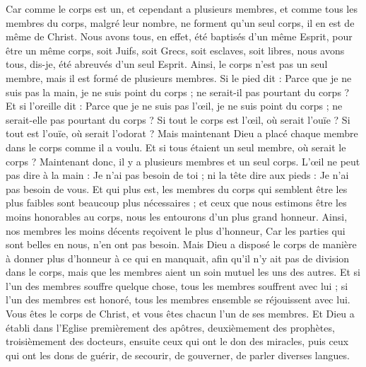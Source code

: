 \begin{multicols}{2}
Car comme le corps est un, et cependant a plusieurs membres, et comme tous les membres du corps, malgré leur nombre, ne forment qu'un seul corps, il en est de même de Christ.
Nous avons tous, en effet, été baptisés d'un même Esprit, pour être un même corps, soit Juifs, soit Grecs, soit esclaves, soit libres, nous avons tous, dis-je, été abreuvés d'un seul Esprit.
Ainsi, le corps n'est pas un seul membre, mais il est formé de plusieurs membres.
Si le pied dit : Parce que je ne suis pas la main, je ne suis point du corps ; ne serait-il pas pourtant du corps ?
Et si l'oreille dit : Parce que je ne suis pas l'œil, je ne suis point du corps ; ne serait-elle pas pourtant du corps ?
Si tout le corps est l'œil, où serait l'ouïe ? Si tout est l'ouïe, où serait l'odorat ?
Mais maintenant Dieu a placé chaque membre dans le corps comme il a voulu.
Et si tous étaient un seul membre, où serait le corps ?
Maintenant donc, il y a plusieurs membres et un seul corps.
L'œil ne peut pas dire à la main : Je n'ai pas besoin de toi ; ni la tête dire aux pieds : Je n'ai pas besoin de vous.
Et qui plus est, les membres du corps qui semblent être les plus faibles sont beaucoup plus nécessaires ;
et ceux que nous estimons être les moins honorables au corps, nous les entourons d'un plus grand honneur. Ainsi, nos membres les moins décents reçoivent le plus d'honneur,
Car les parties qui sont belles en nous, n'en ont pas besoin. Mais Dieu a disposé le corps de manière à donner plus d'honneur à ce qui en manquait,
afin qu'il n'y ait pas de division dans le corps, mais que les membres aient un soin mutuel les uns des autres.
Et si l'un des membres souffre quelque chose, tous les membres souffrent avec lui ; si l'un des membres est honoré, tous les membres ensemble se réjouissent avec lui.
Vous êtes le corps de Christ, et vous êtes chacun l'un de ses membres.
Et Dieu a établi dans l'Eglise premièrement des apôtres, deuxièmement des prophètes, troisièmement des docteurs, ensuite ceux qui ont le don des miracles, puis ceux qui ont les dons de guérir, de secourir, de gouverner, de parler diverses langues.

\end{multicols}
